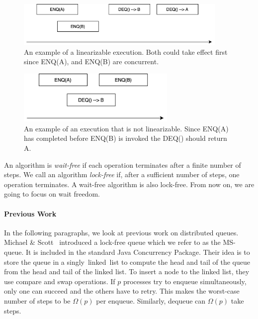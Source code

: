 \documentclass{article}
\begin{document}
\begin{figure}[hbt]
  \center\includegraphics[width=4in]{good}
  \caption{An example of a linearizable execution. Both could take effect first since ENQ(A), and ENQ(B) are concurrent.}
\end{figure}

\begin{figure}[hbt]
  \center\includegraphics[width=3in]{bad}
  \caption{An example of an execution that is not linearizable. Since ENQ(A) has completed before ENQ(B) is invoked the DEQ() should return A.}
\end{figure}


An algorithm is \textit{wait-free} if each operation terminates after a finite number of steps. We call an algorithm \textit{lock-free} if, after a sufficient number of steps, one operation terminates. A wait-free algorithm is also lock-free. From now on, we are going to focus on wait freedom.


\paragraph{Previous Work}

In the following paragraphs, we look at previous work on distributed queues.
Michael \& Scott~\cite{DBLP:conf/podc/MichaelS96} introduced a lock-free queue which we refer to as the MS-queue. It is included in the standard Java Concurrency Package. Their idea is to store the queue in a singly~linked~list to compute the head and tail of the queue from the head and tail of the linked list. To insert a node to the linked list, they use compare and swap operations. If $p$ processes try to enqueue simultaneously, only one can succeed and the others have to retry. This makes the worst-case number of steps to be $\Omega(p)$ per enqueue. Similarly, dequeue can $\Omega(p)$ take steps.
\end{document}
